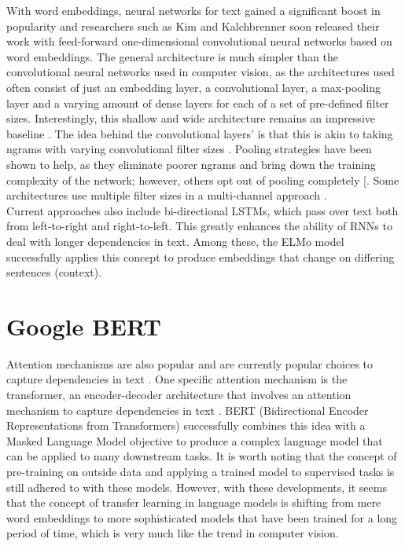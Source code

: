With word embeddings, neural networks for text gained a significant boost in popularity and researchers such as Kim \cite{Kim2014} and Kalchbrenner\cite{Kalchbrenner2014} soon released their work with feed-forward one-dimensional convolutional neural networks based on word embeddings. The general architecture is much simpler than the convolutional neural networks used in computer vision, as the architectures used often consist of just an embedding layer, a convolutional layer, a max-pooling layer and a varying amount of dense layers for each of a set of pre-defined filter sizes. Interestingly, this shallow and wide architecture remains an impressive baseline \cite{Le2017}. The idea behind the convolutional layers’ is that this is akin to taking ngrams with varying convolutional filter sizes \cite{Zhang2015, Jacovi2018} . Pooling strategies have been shown to help, as they eliminate poorer ngrams and bring down the training complexity of the network; however, others opt out of pooling completely [\cite{Kim2014, Zhang2015}. Some architectures use multiple filter sizes in a multi-channel approach \cite{Kim2014,Liu2017,Goldberg2016}.\\

Current approaches also include bi-directional LSTMs, which pass over text both from left-to-right \cite{Radford2018} and right-to-left. This greatly enhances the ability of RNNs to deal with longer dependencies in text. Among these, the ELMo model \cite{Peters2018} successfully applies this concept to produce embeddings that change on differing sentences (context).\\ 

\newpage
\section{Google BERT}
Attention mechanisms are also popular and are currently popular choices to capture dependencies in text \cite{Lin2017, Openai}. One specific attention mechanism is the transformer, an encoder-decoder architecture that involves an attention mechanism to capture dependencies in text \cite{Vaswani2017}. BERT (Bidirectional Encoder Representations from Transformers) \cite{Devlin2018} successfully combines this idea with a Masked Language Model objective to produce a complex language model that can be applied to many downstream tasks. It is worth noting that the concept of pre-training on outside data and applying a trained model to supervised tasks is still adhered to with these models. However, with these developments, it seems that the concept of transfer learning in language models is shifting from mere word embeddings to more sophisticated models that have been trained for a long period of time, which is very much like the trend in computer vision.\\

